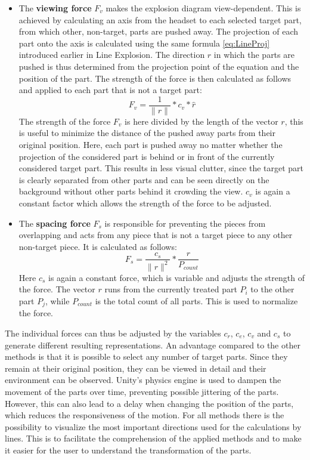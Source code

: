 \begin{itemize}
	\item The \textbf{viewing force} $F_v$ makes the explosion diagram view-dependent. 
	This is achieved by calculating an axis from the headset to each selected target part, from which other, non-target, parts are pushed away. 
	The projection of each part onto the axis is calculated using the same formula \ref{eq:LineProj} introduced earlier in Line Explosion.
	The direction $r$ in which the parts are pushed is thus determined from the projection point of the equation and the position of the part. 
	The strength of the force is then calculated as follows and applied to each part that is not a target part:
	\begin{equation}
		F_v = \frac{1}{\|r\|} * c_v * \hat{r}
		\label{eq:FB_viewingForce}
	\end{equation}
	The strength of the force $F_v$ is here divided by the length of the vector $r$, this is useful to minimize the distance of the pushed away parts from their original position. 
	Here, each part is pushed away no matter whether the projection of the considered part is behind or in front of the currently considered target part. 
	This results in less visual clutter, since the target part is clearly separated from other parts and can be seen directly on the background without other parts behind it crowding the view. 
	$c_v$ is again a constant factor which allows the strength of the force to be adjusted.
	\item The \textbf{spacing force} $F_s$ is responsible for preventing the pieces from overlapping and acts from any piece that is not a target piece to any other non-target piece. It is calculated as follows:
	\begin{equation}
	F_s = \frac{c_s}{\|r\|^2} * \frac{r}{P_{count}}
	\label{eq:FB_spacingForce}
	\end{equation}
	Here $c_s$ is again a constant force, which is variable and adjusts the strength of the force. 
	The vector $r$ runs from the currently treated part $P_i$ to the other part $P_j$, while $P_{count}$ is the total count of all parts. 
	This is used to normalize the force. 
\end{itemize}
The individual forces can thus be adjusted by the variables $c_r$, $c_e$, $c_v$ and $c_s$ to generate different resulting representations. 
An advantage compared to the other methods is that it is possible to select any number of target parts. Since they remain at their original position, they can be viewed in detail and their environment can be observed.   
Unity's physics engine is used to dampen the movement of the parts over time, preventing possible jittering of the parts. 
However, this can also lead to a delay when changing the position of the parts, which reduces the responsiveness of the motion.
For all methods there is the possibility to visualize the most important directions used for the calculations by lines. 
This is to facilitate the comprehension of the applied methods and to make it easier for the user to understand the transformation of the parts.

